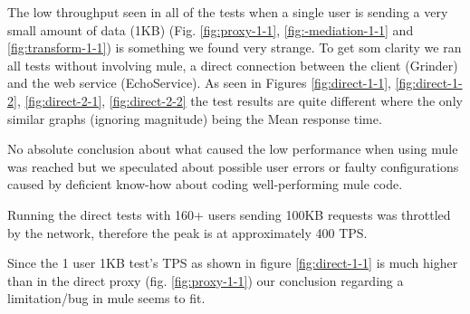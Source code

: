 The low throughput seen in all of the tests when a single user is sending a very small amount of data (1KB) (Fig. \ref{fig:proxy-1-1}, \ref{fig:-mediation-1-1} and \ref{fig:transform-1-1}) is something we found very strange.
To get som clarity we ran all tests without involving mule, a direct connection between the client (Grinder) and the web service (EchoService). As seen in Figures \ref{fig:direct-1-1}, \ref{fig:direct-1-2}, \ref{fig:direct-2-1}, \ref{fig:direct-2-2} the test results are quite different where the only similar graphs (ignoring magnitude) being the Mean response time.

No absolute conclusion about what caused the low performance when using mule was reached but we speculated about possible user errors or faulty configurations caused by deficient know-how about coding well-performing mule code.

Running the direct tests with 160+ users sending 100KB requests was throttled by the network, therefore the peak is at approximately 400 TPS. 

Since the 1 user 1KB test's TPS as shown in figure \ref{fig:direct-1-1} is much higher than in the direct proxy (fig. \ref{fig:proxy-1-1}) our conclusion regarding a limitation/bug in mule seems to fit.

\newpage

